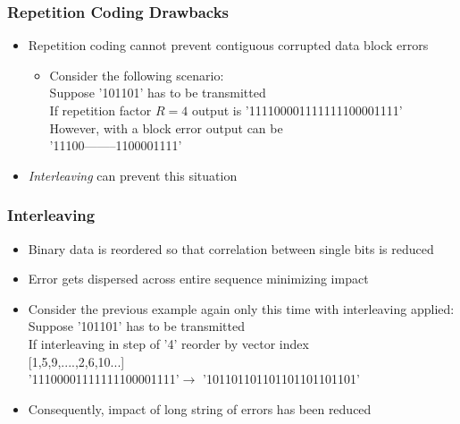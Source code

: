 \documentclass[10pt]{beamer}
\begin{document}
\frame
{
  \frametitle{Repetition Coding Drawbacks}

    \begin{itemize}
        \item Repetition coding cannot prevent contiguous corrupted data block errors 
        \begin{itemize}
         \item Consider the following scenario:\\
         \hspace{5ex}Suppose '101101' has to be transmitted\\
         \hspace{5ex}If repetition factor $R=4$ output is '111100001111111100001111'\\
         \hspace{5ex}However, with a block error output can be\\
          \hspace{5ex}'11100--------1100001111'
        \end{itemize}
        \item \textit{Interleaving} can prevent this situation
    \end{itemize}

}

\frame
{
  \frametitle{Interleaving}

    \begin{itemize}
        \item Binary data is reordered so that correlation between single bits is reduced 
        \item Error gets dispersed across entire sequence minimizing impact
        \item Consider the previous example again only this time with interleaving applied:\\
         \hspace{5ex}Suppose '101101' has to be transmitted\\
         \hspace{5ex}If interleaving in step of '4' reorder by vector index\\
          \hspace{20ex}[1,5,9,....,2,6,10...]\\
          \hspace{5ex}'11100001111111100001111'$\rightarrow$ '101101101101101101101101'\\
          \item Consequently, impact of long string of errors has been reduced
    \end{itemize}

}
\end{document}
